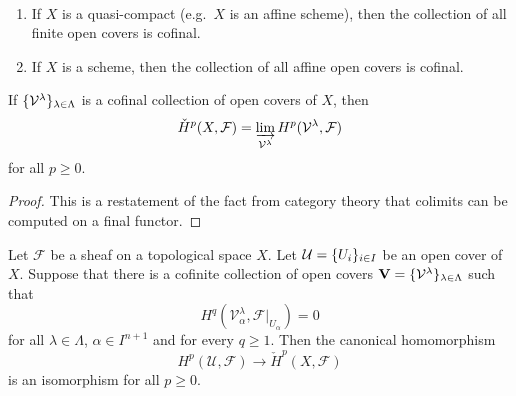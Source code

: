 \begin{remark}~
	\begin{enumerate}
		\item If $X$ is a quasi-compact (e.g.~$X$ is an affine scheme), then the collection of all finite open covers is cofinal.
		
		\item If $X$ is a scheme, then the collection of all affine open covers is cofinal.
	\end{enumerate}
\end{remark}

\begin{lemma}
	If  $\lbrace\mathcal{V}^\lambda\rbrace_{\lambda \in \Lambda}$ is a cofinal collection of open covers of $X$, then
	\begin{equation*}
		\check{H}^p(X, \mathcal{F}) = \varinjlim_{\mathcal{V}^\lambda} H^p(\mathcal{V}^\lambda, \mathcal{F})
	\end{equation*}
	for all $p \geq 0$.
\end{lemma}
\begin{proof}
	This is a restatement of the fact from category theory that colimits can be computed on a final functor.
\end{proof}

\begin{theorem}
	Let $\mathcal{F}$ be a sheaf on a topological space $X$. Let $\mathcal{U} = \lbrace U_i\rbrace_{i \in I}$ be an open cover of $X$. Suppose that there is a cofinite collection of open covers $\mathbf{V} = \lbrace\mathcal{V}^\lambda\rbrace_{\lambda \in \Lambda}$ such that
	\begin{equation*}
		H^q(\mathcal{V}^\lambda_\alpha, \mathcal{F}|_{U_\alpha}) = 0
	\end{equation*}
	for all $\lambda \in \Lambda$, $\alpha \in I^{n + 1}$ and for every $q \geq 1$. Then the canonical homomorphism
	\begin{equation*}
		H^p(\mathcal{U}, \mathcal{F}) \to \check{H}^p(X, \mathcal{F})
	\end{equation*}
	is an isomorphism for all $p \geq 0$.
\end{theorem}
